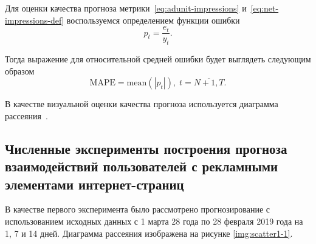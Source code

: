 Для оценки качества прогноза метрики~\eqref{eq:adunit-impressions} и~\eqref{eq:net-impressions-def} воспользуемся определением функции
ошибки
\begin{equation}
    p_t = \dfrac{e_t}{y_t}.
\end{equation}

Тогда выражение для относительной средней ошибки будет выглядеть следующим образом
\begin{equation}
    \text{MAPE} = \text{mean}\left( \left| p_t \right| \right),\; t = \overline{N+1, T}.
\end{equation}

В качестве визуальной оценки качества прогноза используется диаграмма рассеяния~\autocite{eval:scatter}.

\subsection{Численные эксперименты построения прогноза взаимодействий пользователей с рекламными элементами интернет-страниц}

В качестве первого эксперимента было рассмотрено прогнозирование с использованием исходных данных с 1 марта 28 года по 28 февраля 2019 года
на 1, 7 и 14 дней. Диаграмма рассеяния изображена на рисунке \ref{img:scatter1-1}.








